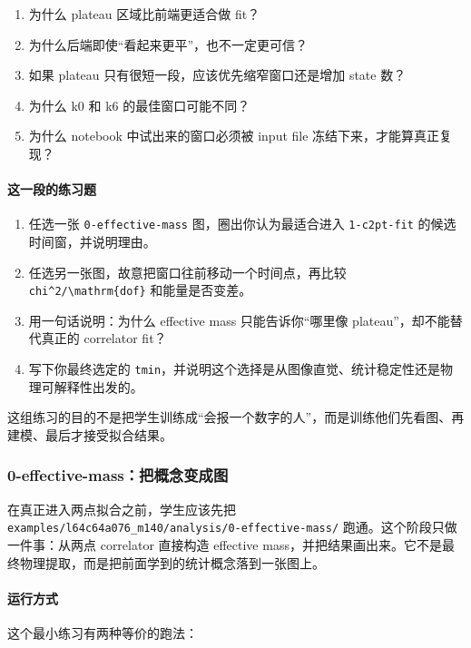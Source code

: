 \documentclass[11pt,a4paper,fontset=fandol]{ctexart}
\begin{document}
\begin{enumerate}[leftmargin=2em]
  \item 为什么 plateau 区域比前端更适合做 fit？
  \item 为什么后端即使“看起来更平”，也不一定更可信？
  \item 如果 plateau 只有很短一段，应该优先缩窄窗口还是增加 state 数？
  \item 为什么 k0 和 k6 的最佳窗口可能不同？
  \item 为什么 notebook 中试出来的窗口必须被 input file 冻结下来，才能算真正复现？
\end{enumerate}

\paragraph{这一段的练习题}

\begin{enumerate}[leftmargin=2em]
  \item 任选一张 \lstinline|0-effective-mass| 图，圈出你认为最适合进入 \lstinline|1-c2pt-fit| 的候选时间窗，并说明理由。
  \item 任选另一张图，故意把窗口往前移动一个时间点，再比较 \lstinline|chi^2/\mathrm{dof}| 和能量是否变差。
  \item 用一句话说明：为什么 effective mass 只能告诉你“哪里像 plateau”，却不能替代真正的 correlator fit？
  \item 写下你最终选定的 \lstinline|tmin|，并说明这个选择是从图像直觉、统计稳定性还是物理可解释性出发的。
\end{enumerate}

这组练习的目的不是把学生训练成“会报一个数字的人”，而是训练他们先看图、再建模、最后才接受拟合结果。

\subsubsection{0-effective-mass：把概念变成图}

在真正进入两点拟合之前，学生应该先把 \lstinline|examples/l64c64a076_m140/analysis/0-effective-mass/| 跑通。这个阶段只做一件事：从两点 correlator 直接构造 effective mass，并把结果画出来。它不是最终物理提取，而是把前面学到的统计概念落到一张图上。

\paragraph{运行方式}

这个最小练习有两种等价的跑法：
\end{document}
